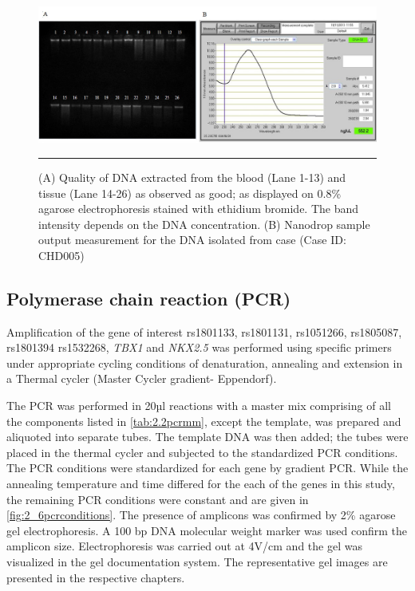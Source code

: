 \begin{refsection}
\begin{figure}[!tb]
\centering
\includegraphics[width=\linewidth]{Figures/2_5DNAqlty.pdf} 
\rule{35em}{0.5pt}
\caption[DNA quality and Nanodrop sample output]{(A) Quality of DNA extracted from the blood (Lane 1-13) and tissue (Lane 14-26)  as observed as good; as displayed on 0.8\% agarose electrophoresis stained with ethidium bromide. The band intensity depends on the DNA concentration. (B) Nanodrop sample output measurement for the DNA isolated from case (Case ID: CHD005)}
\label{fig:2_5DNAqlty}
\end{figure}

\subsection{Polymerase chain reaction (PCR)}

Amplification of the gene of interest rs1801133, rs1801131, rs1051266, rs1805087, rs1801394  rs1532268, \textit{TBX1} and \textit{NKX2.5} was performed using specific primers under appropriate cycling conditions of denaturation, annealing and extension in a Thermal cycler (Master Cycler gradient- Eppendorf).

The PCR was performed in 20µl reactions with a master mix comprising of all the components listed in \cref{tab:2.2pcrmm}, except the template, was prepared and aliquoted into separate tubes. The template DNA was then added; the tubes were placed in the thermal cycler and subjected to the standardized PCR conditions. The PCR conditions were standardized for each gene by gradient PCR. While the annealing temperature and time differed for the each of the genes in this study, the remaining PCR conditions were constant and are given in \cref{fig:2_6pcrconditions}. The presence of amplicons was confirmed by 2\% agarose gel electrophoresis. A 100 bp DNA molecular weight marker was used confirm the amplicon size. Electrophoresis was carried out at 4V/cm and the gel was visualized in the gel documentation system. The representative gel images are presented in the respective chapters.


\end{refsection}
